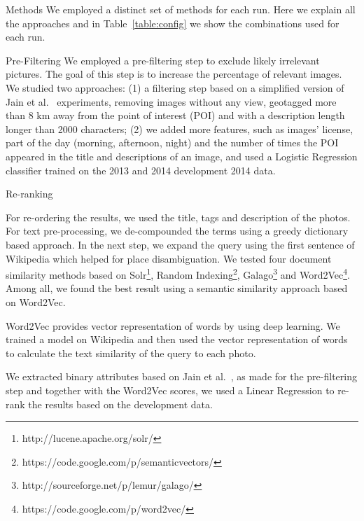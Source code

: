 \documentclass{acm_proc_article-me}
\begin{document}
\begin{section}{Methods}
We employed a distinct set of methods for each run. 
Here we explain all the approaches and in Table~\ref{table:config} we show the combinations used for each run.

\begin{subsection}{Pre-Filtering}
We employed a pre-filtering step to exclude likely irrelevant pictures.
The goal of this step is to increase the percentage of relevant images.
We studied two approaches: (1) a filtering step based on a simplified version of Jain et al.~\cite{wsp13} experiments, removing images without any view, geotagged more than 8 km away from the point of interest (POI) and with a description length longer than 2000 characters; (2) we added more features, such as images' license, part of the day (morning, afternoon, night) and the number of times the POI appeared in the title and descriptions of an image, and used a Logistic Regression classifier trained on the 2013 and 2014 development 2014 data.
\end{subsection}


\begin{subsection}{Re-ranking}

For re-ordering the results, we used the title, tags and description of the photos. For text pre-processing, we de-compounded the terms using a greedy dictionary based approach. In the next step, we expand the query using the first sentence of Wikipedia which helped for place disambiguation. We tested four document similarity methods based on Solr\footnote{http://lucene.apache.org/solr/}, Random Indexing\footnote{https://code.google.com/p/semanticvectors/}, Galago\footnote{http://sourceforge.net/p/lemur/galago/} and Word2Vec\footnote{https://code.google.com/p/word2vec/}\cite{word2vec}. Among all, we found the best result using a semantic similarity approach based on Word2Vec.

Word2Vec provides vector representation of words by using deep learning. We trained a model on Wikipedia and then used the vector representation of words to calculate the text similarity of the query to each photo.

We extracted binary attributes based on Jain et al.~\cite{wsp13}, as made for the pre-filtering step and together with the Word2Vec scores, we used a Linear Regression to re-rank the results based on the development data.



\end{subsection}
\end{section}
\end{document}
